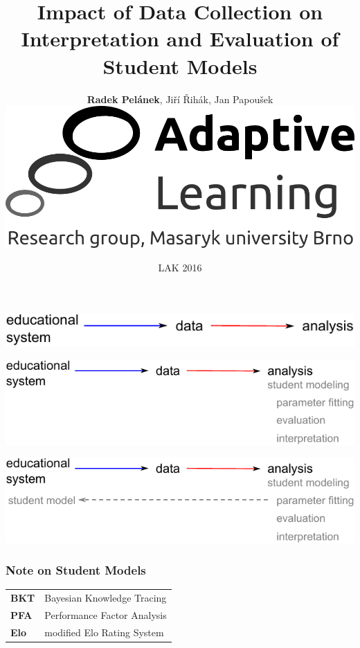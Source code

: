 \documentclass[bigger]{beamer}
\title{Impact of Data Collection on Interpretation and Evaluation of Student
  Models}
\author{\textbf{Radek Pel\'anek}, Ji\v{r}\'i \v{R}ih\'ak, Jan Papou\v{s}ek\\[10mm]
\includegraphics[width=.3\linewidth]{al-logo}
}
\date{LAK 2016}
\begin{document}
\frame{\titlepage}

\begin{frame}
  \begin{center}
    \includegraphics[width=\linewidth]{intro1}
  \end{center}
\end{frame}

\begin{frame}
  \begin{center}
    \includegraphics[width=\linewidth]{intro2}
  \end{center}
\end{frame}

\begin{frame}
  \begin{center}
    \includegraphics[width=\linewidth]{intro3}
  \end{center}
\end{frame}

\begin{frame}
  \frametitle{Note on Student Models}

  \begin{center}
    \begin{tabular}{ll}
 \textbf{BKT} & Bayesian Knowledge Tracing \\[3mm]
 \textbf{PFA} & Performance Factor Analysis \\[3mm]
 \textbf{Elo} & modified Elo Rating System  \\    
    \end{tabular}
  \end{center}
\end{frame}
\end{document}
